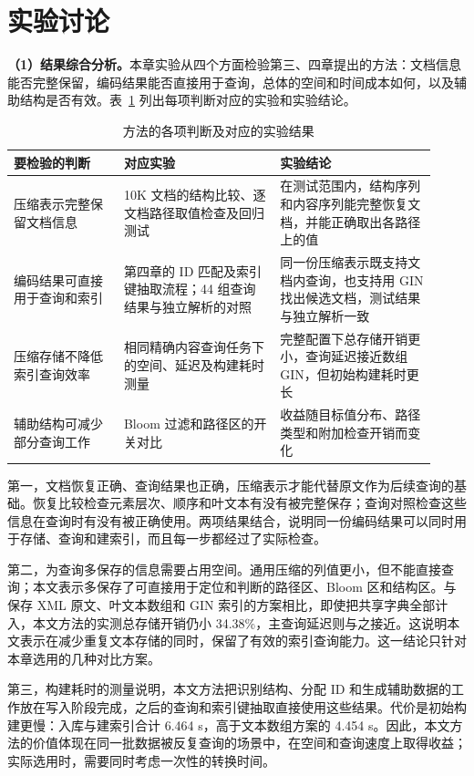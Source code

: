 \section{实验讨论}
\textbf{（1）结果综合分析。}本章实验从四个方面检验第三、四章提出的方法：文档信息能否完整保留，编码结果能否直接用于查询，总体的空间和时间成本如何，以及辅助结构是否有效。表~\ref{tab:method-evidence} 列出每项判断对应的实验和实验结论。

\begin{table}[htbp]
\centering\small
\caption{方法的各项判断及对应的实验结果}
\label{tab:method-evidence}
\setlength{\tabcolsep}{4pt}
\begin{tabular}{p{0.24\linewidth}p{0.34\linewidth}p{0.34\linewidth}}
\toprule
要检验的判断 & 对应实验 & 实验结论 \\
\midrule
压缩表示完整保留文档信息 & 10K 文档的结构比较、逐文档路径取值检查及回归测试 & 在测试范围内，结构序列和内容序列能完整恢复文档，并能正确取出各路径上的值 \\
编码结果可直接用于查询和索引 & 第四章的 ID 匹配及索引键抽取流程；44 组查询结果与独立解析的对照 & 同一份压缩表示既支持文档内查询，也支持用 GIN 找出候选文档，测试结果与独立解析一致 \\
压缩存储不降低索引查询效率 & 相同精确内容查询任务下的空间、延迟及构建耗时测量 & 完整配置下总存储开销更小，查询延迟接近数组 GIN，但初始构建耗时更长 \\
辅助结构可减少部分查询工作 & Bloom 过滤和路径区的开关对比 & 收益随目标值分布、路径类型和附加检查开销而变化 \\
\bottomrule
\end{tabular}
\end{table}

第一，文档恢复正确、查询结果也正确，压缩表示才能代替原文作为后续查询的基础。恢复比较检查元素层次、顺序和叶文本有没有被完整保存；查询对照检查这些信息在查询时有没有被正确使用。两项结果结合，说明同一份编码结果可以同时用于存储、查询和建索引，而且每一步都经过了实际检查。

第二，为查询多保存的信息需要占用空间。通用压缩的列值更小，但不能直接查询；本文表示多保存了可直接用于定位和判断的路径区、Bloom 区和结构区。与保存 XML 原文、叶文本数组和 GIN 索引的方案相比，即使把共享字典全部计入，本文方法的实测总存储开销仍小 34.38\%，主查询延迟则与之接近。这说明本文表示在减少重复文本存储的同时，保留了有效的索引查询能力。这一结论只针对本章选用的几种对比方案。

第三，构建耗时的测量说明，本文方法把识别结构、分配 ID 和生成辅助数据的工作放在写入阶段完成，之后的查询和索引键抽取直接使用这些结果。代价是初始构建更慢：入库与建索引合计 6.464 s，高于文本数组方案的 4.454 s。因此，本文方法的价值体现在同一批数据被反复查询的场景中，在空间和查询速度上取得收益；实际选用时，需要同时考虑一次性的转换时间。

